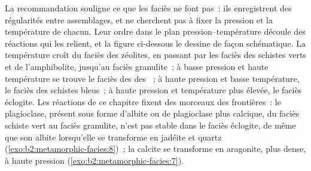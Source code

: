 La recommandation souligne ce que les faciès ne font pas~: ils enregistrent des régularités entre
assemblages, et ne cherchent pas à fixer la pression et la température de chacun. Leur ordre dans le
plan pression--température découle des réactions qui les relient, et la figure
ci-dessous le dessine de façon schématique. La température croît du faciès des zéolites, en passant par les
faciès des schistes verts et de l'amphibolite, jusqu'au faciès granulite~; à basse pression et haute
température se trouve le faciès des  des ~; à haute pression et basse
température, le faciès des schistes bleus~; à haute pression et température plus élevée, le
faciès éclogite. Les réactions de ce chapitre fixent des morceaux des frontières~: le plagioclase,
présent sous forme d'albite ou de plagioclase plus calcique, du faciès schiste vert au faciès granulite,
n'est pas stable dans le faciès éclogite, de même que son albite lorsqu'elle se transforme en jadéite et quartz
(\cref{exo:b2:metamorphic-facies:8})~; la calcite se transforme en aragonite, plus dense, à haute pression
(\cref{exo:b2:metamorphic-facies:7}).


